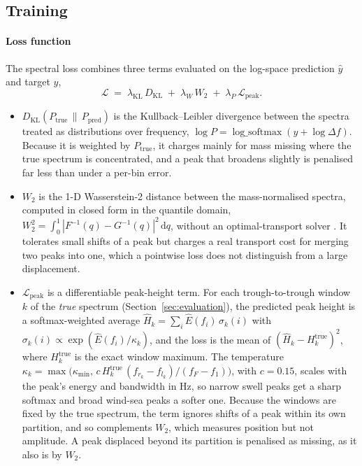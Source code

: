 \subsection{Training}
\label{sec:training}
 
\paragraph{Loss function}
The spectral loss combines three terms evaluated on the log-space prediction $\hat{y}$ and target $y$,
\begin{equation}
\mathcal{L} \;=\; 
\lambda_{\text{KL}}\,D_{\text{KL}}
\;+\; \lambda_{W}\,W_2
\;+\; \lambda_{P}\,\mathcal{L}_{\text{peak}} .
\label{eq:loss}
\end{equation}

\begin{itemize}
  \item $D_{\text{KL}}(P_{\text{true}}\,\|\,P_{\text{pred}})$ is the Kullback--Leibler divergence \citep{kullback1951} between the spectra treated as distributions over frequency, $\log P = \operatorname{log\_softmax}(y + \log \Delta f)$. Because it is weighted by $P_{\text{true}}$, it charges mainly for mass missing where the true spectrum is concentrated, and a peak that broadens slightly is penalised far less than under a per-bin error.
  \item $W_2$ is the 1-D Wasserstein-2 distance between the mass-normalised spectra, computed in closed form in the quantile domain,
  $W_2^2 = \int_0^1 |F^{-1}(q)-G^{-1}(q)|^2\,\mathrm{d}q$,
  without an optimal-transport solver \citep{peyre2019}. It tolerates small shifts of a peak but charges a real transport cost for merging two peaks into one, which a pointwise loss does not distinguish from a large displacement.
  \item $\mathcal{L}_{\text{peak}}$ is a differentiable peak-height term. For each trough-to-trough window $k$ of the \emph{true} spectrum (Section~\ref{sec:evaluation}), the predicted peak height is a softmax-weighted average $\hat{H}_k = \sum_{i} \hat{E}(f_i)\,\sigma_k(i)$ with $\sigma_k(i) \propto \exp(\hat{E}(f_i)/\kappa_k)$, and the loss is the mean of $(\hat{H}_k - H_k^{\text{true}})^2$, where $H_k^{\text{true}}$ is the exact window maximum. The temperature $\kappa_k = \max\!\big(\kappa_{\min},\, c\,H_k^{\text{true}}\,(f_{r_k}-f_{l_k})/(f_F - f_1)\big)$, with $c=0.15$, scales with the peak's energy and bandwidth in Hz, so narrow swell peaks get a sharp softmax and broad wind-sea peaks a softer one. Because the windows are fixed by the true spectrum, the term ignores shifts of a peak within its own partition, and so complements $W_2$, which measures position but not amplitude. A peak displaced beyond its partition is penalised as missing, as it also is by $W_2$.
\end{itemize}
